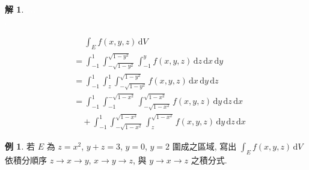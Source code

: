 \documentclass[12pt]{extarticle}
\newcommand{\ds}{\displaystyle}
\theoremstyle{definition}
\newtheorem*{ex}{例}
\newtheorem*{sol}{解}
\begin{document}
{\begin{sol}
  \begin{minipage}{0.57\textwidth}
    \includegraphics[scale=0.8,page=30]{fig/prob.pdf}\hspace{-8mm} 
    \includegraphics[scale=0.75,page=31]{fig/prob.pdf} 
    \includegraphics[scale=0.8,page=32]{fig/prob.pdf} \\ 
    \includegraphics[scale=0.8,page=33]{fig/prob.pdf} 
  \end{minipage}
  \begin{minipage}{0.43\textwidth}
    \begin{align*}
      &\quad\;\int_E f(x, y, z)\,\text{d}V \\
      &= \int_{-1}^{1}\int_{-\sqrt{1 - y^2}}^{\sqrt{1 - y^2}}\!\int_{-1}^{y}\!f(x, y, z)\,\text{d}z\,\text{d}x\,\text{d}y \\
      &= \int_{-1}^{1}\int_{z}^{1}\!\!\int_{-\sqrt{1 - y^2}}^{\sqrt{1 - y^2}}\!f(x, y, z)\,\text{d}x\,\text{d}y\,\text{d}z \\
      &= \int_{-1}^{1}\int_{-1}^{-\sqrt{1 - x^2}}\!\!\!\!\int_{-\sqrt{1 - x^2}}^{\sqrt{1 - x^2}}\!f(x, y, z)\,\text{d}y\,\text{d}z\,\text{d}x \\
      &\quad + \int_{-1}^{1}\int_{-\sqrt{1 - x^2}}^{\sqrt{1 - x^2}}\!\int_{z}^{\sqrt{1 - x^2}}\!f(x, y, z)\,\text{d}y\,\text{d}z\,\text{d}x 
    \end{align*}
  \end{minipage}
\end{sol}

\begin{ex}
  若 $E$ 為 $z = x^2$, $y + z = 3$, $y = 0$, $y = 2$ 圍成之區域, 寫出 $\ds\int_E f(x, y, z)\,\text{d}V$ 依積分順序 $z\to x\to y$, $x\to y\to z$, 與 $y\to x\to z$ 之積分式.
\end{ex}

}
\end{document}
